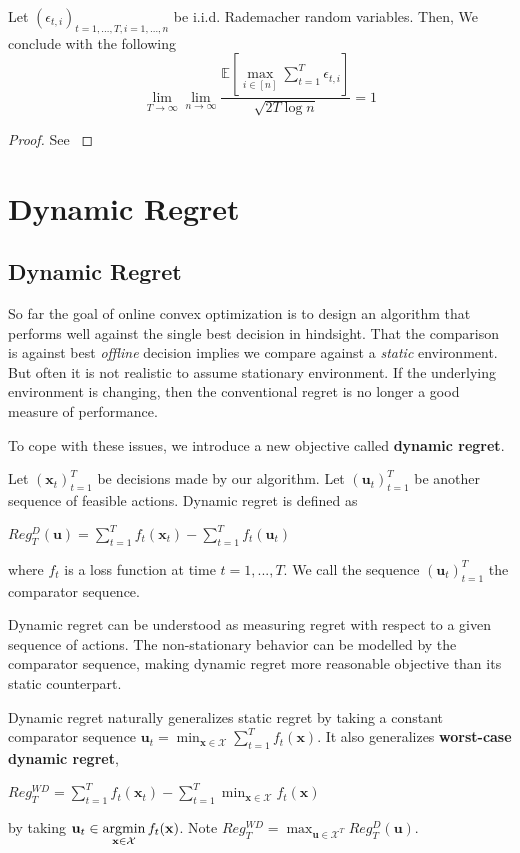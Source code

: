 \documentclass[12pt, a4paper]{report}
\begin{document}
\begin{lem}
Let $(\epsilon_{t, i})_{t=1, \dots, T, i = 1, \dots, n}$ be i.i.d. Rademacher random variables. Then,
We conclude with the following 
\begin{equation*}
    \lim_{T \rightarrow \infty}\lim_{n \rightarrow \infty} \frac{\mathbb{E} \left[ \max_{i \in [n]}\sum_{t=1}^T \epsilon_{t, i}\right]}{\sqrt{2T\log n}} = 1
\end{equation*}
\end{lem}
\begin{proof}
See \cite[lemma~A.22]{CesaBianchi2006PredictionLA}
\end{proof}

\chapter{Dynamic Regret}
\label{Chap3}
\section{Dynamic Regret}
So far the goal of online convex optimization is to design an algorithm that performs well against the single best decision in hindsight. That the comparison is against best \textit{offline} decision implies we compare against a \textit{static} environment. But often it is not realistic to assume stationary environment. If the underlying environment is changing, then the conventional regret is no longer a good measure of performance. 

To cope with these issues, we introduce a new objective called \textbf{dynamic regret}. 
\begin{defn}
Let $(\mathbf{x}_t)_{t=1}^{T}$ be decisions made by our algorithm. Let $(\mathbf{u}_t)_{t=1}^{T}$ be another sequence of feasible actions. Dynamic regret is defined as
\begin{center}
    $\displaystyle Reg_{T}^{D}(\mathbf{u}) = \sum_{t=1}^{T}f_t(\mathbf{x}_t) - \sum_{t=1}^{T}f_t(\mathbf{u}_t)$
\end{center}
where $f_t$ is a loss function at time $t=1, ..., T$. We call the sequence  $(\mathbf{u}_t)_{t=1}^T$ the comparator sequence.
\end{defn}
Dynamic regret can be understood as measuring regret with respect to a given sequence of actions. The non-stationary behavior can be modelled by the comparator sequence, making dynamic regret more reasonable objective than its static counterpart.

Dynamic regret naturally generalizes static regret by taking a constant comparator sequence $\mathbf{u}_t = \min_{\mathbf{x} \in \mathcal{X}} \sum_{t=1}^{T} f_t(\mathbf{x})$. It also generalizes \textbf{worst-case dynamic regret},
\begin{center}
    $\displaystyle Reg_{T}^{WD} = \sum_{t=1}^{T} f_t(\mathbf{x}_t) - \sum_{t=1}^{T} \min_{\mathbf{x} \in \mathcal{X}} f_t(\mathbf{x})$
\end{center}
by taking $\displaystyle \mathbf{u}_t \in \operatorname*{argmin}_{\mathbf{x} \in \mathcal{X}} f_t(\mathbf{x})$. Note $\displaystyle Reg_T^{WD} = \max_{\mathbf{u}\in \mathcal{X}^T} Reg_T^D(\mathbf{u})$. 
\end{document}
